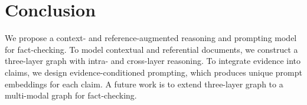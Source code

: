 \section{Conclusion}

We propose a context- and reference-augmented reasoning and prompting model for fact-checking. To model contextual and referential documents, we construct a three-layer graph with intra- and cross-layer reasoning. To integrate evidence into claims, we design evidence-conditioned prompting, which produces unique prompt embeddings for each claim. A future work is to extend three-layer graph to a multi-modal graph for fact-checking.
